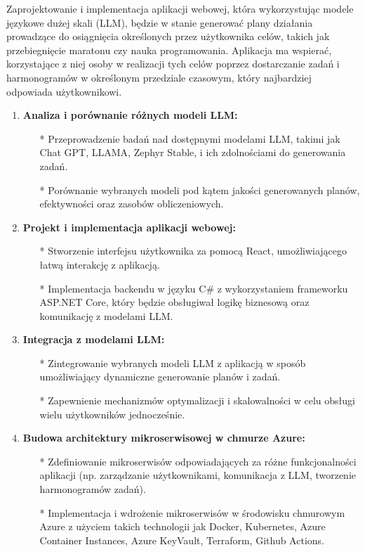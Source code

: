 Zaprojektowanie i implementacja aplikacji webowej, która wykorzystując modele językowe dużej skali (LLM), będzie w stanie generować plany działania prowadzące do osiągnięcia określonych przez użytkownika celów, takich jak przebiegnięcie maratonu czy nauka programowania. Aplikacja ma wspierać, korzystające z niej osoby w realizacji tych celów poprzez dostarczanie zadań i harmonogramów w określonym przedziale czasowym, który najbardziej odpowiada użytkownikowi.
\\

\begin{enumerate}
    \item {\bf Analiza i porównanie różnych modeli LLM:}
        \begin{itemize}
            \item[*] Przeprowadzenie badań nad dostępnymi modelami LLM, takimi jak Chat GPT, LLAMA, Zephyr Stable, i ich zdolnościami do generowania zadań.
            \item[*] Porównanie wybranych modeli pod kątem jakości generowanych planów, efektywności oraz zasobów obliczeniowych.
       \end{itemize}
    
    \item {\bf Projekt i implementacja aplikacji webowej:}
        \begin{itemize}
            \item[*] Stworzenie interfejsu użytkownika za pomocą React, umożliwiającego łatwą interakcję z aplikacją.
            \item[*] Implementacja backendu w języku C\# z wykorzystaniem frameworku ASP.NET Core, który będzie obsługiwał logikę biznesową oraz komunikację z modelami LLM.
       \end{itemize}
    
    \item {\bf Integracja z modelami LLM:}
        \begin{itemize}
            \item[*] Zintegrowanie wybranych modeli LLM z aplikacją w sposób umożliwiający dynamiczne generowanie planów i zadań.
            \item[*] Zapewnienie mechanizmów optymalizacji i skalowalności w celu obsługi wielu użytkowników jednocześnie.
       \end{itemize}
    
    \item {\bf Budowa architektury mikroserwisowej w chmurze Azure:}
        \begin{itemize}
            \item[*] Zdefiniowanie mikroserwisów odpowiadających za różne funkcjonalności aplikacji (np. zarządzanie użytkownikami, komunikacja z LLM, tworzenie harmonogramów zadań).
            \item[*] Implementacja i wdrożenie mikroserwisów w środowisku chmurowym Azure z użyciem takich technologii jak Docker, Kubernetes, Azure Container Instances, Azure KeyVault, Terraform, Github Actions.
       \end{itemize}
    

\end{enumerate}
